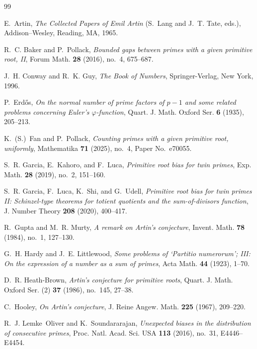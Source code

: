 \documentclass[11pt]{amsart}
\theoremstyle{definition}
\begin{document}
\begin{thebibliography}{99}

	E.~Artin,
	\emph{The Collected Papers of Emil Artin} (S.~Lang and J.~T. Tate, eds.),
	Addison--Wesley, Reading, MA, 1965.

	R.~C. Baker and P.~Pollack,
	\emph{Bounded gaps between primes with a given primitive root, II},
	Forum Math. \textbf{28} (2016), no.~4, 675--687.

	J.~H. Conway and R.~K. Guy,
	\emph{The Book of Numbers},
	Springer-Verlag, New York, 1996.

	P.~Erd\H{o}s,
	\emph{On the normal number of prime factors of $p-1$ and some related problems
		concerning Euler's $\varphi$-function},
	Quart. J. Math. Oxford Ser. \textbf{6} (1935), 205--213.

	K.~(S.)~Fan and P.~Pollack,
	\emph{Counting primes with a given primitive root, uniformly},
	Mathematika \textbf{71} (2025), no.~4, Paper No.~e70055.

	S.~R. Garcia, E.~Kahoro, and F.~Luca,
	\emph{Primitive root bias for twin primes},
	Exp. Math. \textbf{28} (2019), no.~2, 151--160.

	S.~R. Garcia, F.~Luca, K.~Shi, and G.~Udell,
	\emph{Primitive root bias for twin primes II: Schinzel-type theorems for
		totient quotients and the sum-of-divisors function},
	J. Number Theory \textbf{208} (2020), 400--417.

	R.~Gupta and M.~R. Murty,
	\emph{A remark on Artin's conjecture},
	Invent. Math. \textbf{78} (1984), no.~1, 127--130.

	G.~H. Hardy and J.~E. Littlewood,
	\emph{Some problems of `Partitio numerorum'; III: On the expression of a
		number as a sum of primes},
	Acta Math. \textbf{44} (1923), 1--70.

	D.~R. Heath-Brown,
	\emph{Artin's conjecture for primitive roots},
	Quart. J. Math. Oxford Ser. (2) \textbf{37} (1986), no.~145, 27--38.

	C.~Hooley,
	\emph{On Artin's conjecture},
	J. Reine Angew. Math. \textbf{225} (1967), 209--220.

	R.~J. Lemke~Oliver and K.~Soundararajan,
	\emph{Unexpected biases in the distribution of consecutive primes},
	Proc. Natl. Acad. Sci. USA \textbf{113} (2016), no.~31, E4446--E4454.


\end{thebibliography}
\end{document}
